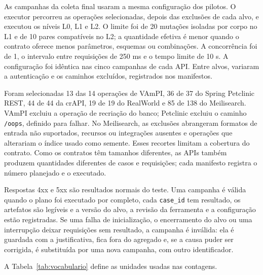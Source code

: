 As campanhas da coleta final usaram a mesma configuração dos pilotos. O
executor percorreu as operações selecionadas, depois das exclusões de cada
alvo, e executou os níveis L0, L1 e L2. O limite foi de 20 mutações isoladas
por corpo no L1 e de 10 pares compatíveis no L2; a quantidade efetiva é menor
quando o contrato oferece menos parâmetros, esquemas ou combinações. A concorrência foi de 1, o
intervalo entre requisições de 250 ms e o tempo limite de 10 s. A configuração
foi idêntica nas cinco campanhas de cada API. Entre alvos, variaram a
autenticação e os caminhos excluídos, registrados nos manifestos.

Foram selecionadas 13 das 14 operações de VAmPI, 36 de 37 do Spring Petclinic
REST, 44 de 44 da crAPI, 19 de 19 do RealWorld e 85 de 138 do Meilisearch.
VAmPI excluiu a operação de recriação do banco; Petclinic excluiu o caminho
\texttt{/oops}, definido para falhar. No Meilisearch, as exclusões abrangeram
formatos de entrada não suportados, recursos ou integrações ausentes e operações
que alterariam o índice usado como semente. Esses recortes limitam a cobertura
do contrato. Como os contratos têm tamanhos diferentes, as APIs também produzem
quantidades diferentes de casos e requisições; cada manifesto registra o número
planejado e o executado.

Respostas 4xx e 5xx são resultados normais do teste. Uma campanha é válida
quando o plano foi executado por completo, cada \texttt{case\_id} tem
resultado, os artefatos são legíveis e a versão do alvo, a revisão da
ferramenta e a configuração estão registradas. Se uma falha de inicialização,
o encerramento do alvo ou uma interrupção deixar requisições sem resultado, a
campanha é inválida: ela é guardada com a justificativa, fica fora do agregado
e, se a causa puder ser corrigida, é substituída por uma nova campanha, com
outro identificador.

A Tabela~\ref{tab:vocabulario} define as unidades usadas nas contagens.

